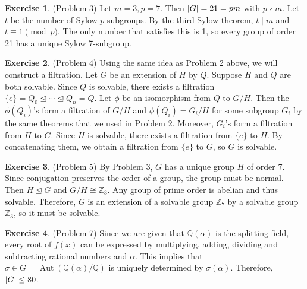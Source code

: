 \documentclass[12pt, psamsfonts]{amsart}
\theoremstyle{definition}
\newtheorem*{exer}{Exercise}
\theoremstyle{remark}
\DeclareMathOperator{\Aut}{Aut}
\numberwithin{equation}{section}
\begin{document}
\begin{exer}{(Problem 3)}
  Let $m = 3, p = 7$.
  Then $\abs{G} = 21 = pm$ with $p \nmid m$.
  Let $t$ be the number of Sylow $p$-subgroups.
  By the third Sylow theorem, $t \mid m$ and $t \equiv 1 \pmod p$.
  The only number that satisfies this is 1, so every group of order 21 has a unique Sylow 7-subgroup.
\end{exer}

\begin{exer}{(Problem 4)}
  Using the same idea as Problem 2 above, we will construct a filtration.
  Let $G$ be an extension of $H$ by $Q$.
  Suppose $H$ and $Q$ are both solvable.
  Since $Q$ is solvable, there exists a filtration $\{ e \} = Q_0 \trianglelefteq \cdots \trianglelefteq Q_n = Q$.
  Let $\phi$ be an isomorphism from $Q$ to $G / H$.
  Then the $\phi(Q_i)$'s form a filtration of $G / H$ and $\phi(Q_i) = G_i / H$ for some subgroup $G_i$ by the same theorems that we used in Problem 2.
  Moreover, $G_i$'s form a filtration from $H$ to $G$.
  Since $H$ is solvable, there exists a filtration from $\{ e \}$ to $H$.
  By concatenating them, we obtain a filtration from $\{ e \}$ to $G$, so $G$ is solvable.
\end{exer}

\begin{exer}{(Problem 5)}
  By Problem 3, $G$ has a unique group $H$ of order 7.
  Since conjugation preserves the order of a group, the group must be normal.
  Then $H \trianglelefteq G$ and $G / H \cong \mathbb{Z}_3$.
  Any group of prime order is abelian and thus solvable.
  Therefore, $G$ is an extension of a solvable group $\mathbb{Z}_7$ by a solvable group $\mathbb{Z}_3$, so it must be solvable.
\end{exer}

\begin{exer}{(Problem 7)}
  Since we are given that $\mathbb{Q}(\alpha)$ is the splitting field, every root of $f(x)$ can be expressed by multiplying, adding, dividing and subtracting rational numbers and $\alpha$.
  This implies that $\sigma \in G = \Aut(\mathbb{Q}(\alpha)/\mathbb{Q})$ is uniquely determined by $\sigma(\alpha)$.
  Therefore, $\abs{G} \leq 80$.

\end{exer}
\end{document}
